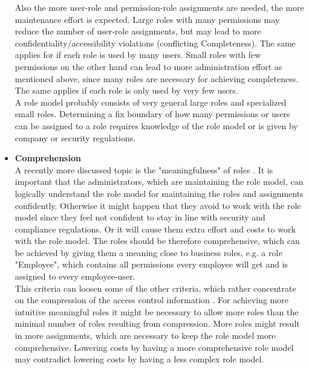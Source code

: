 \begin{itemize}
        Also the more user-role and permission-role assignments are needed, the more maintenance effort is expected. Large roles with many permissions may reduce the number of user-role assignments, but may lead to more confidentiality/accessibility violations (conflicting Completeness). The same applies for if each role is used by many users. Small roles with few permissions on the other hand can lead to more administration effort as mentioned above, since many roles are necessary for achieving completeness. The same applies if each role is only used by very few users.\\
        A role model probably consists of very general large roles and specialized small roles. Determining a fix boundary of how many permissions or users can be assigned to a role requires knowledge of the role model or is given by company or security regulations.
        \item \textbf{Comprehension}\\
        A recently more discussed topic is the "meaningfulness" of roles \cite{Xu}\cite{Frank}. It is important that the administrators, which are maintaining the role model, can logically understand the role model for maintaining the roles and assignments confidently. Otherwise it might happen that they avoid to work with the role model since they feel not confident to stay in line with security and compliance regulations. Or it will cause them extra effort and costs to work with the role model. The roles should be therefore comprehensive, which can be achieved by giving them a meaning close to business roles, e.g. a role "Employee", which contains all permissions every employee will get and is assigned to every employee-user.\\
        This criteria can loosen some of the other criteria, which rather concentrate on the compression of the access control information \cite{Frank2013}. For achieving more intuitive meaningful roles it might be necessary to allow more roles than the minimal number of roles resulting from compression. More roles might result in more assignments, which are necessary to keep the role model more comprehensive. Lowering costs by having a more comprehensive role model may contradict lowering costs by having a less complex role model.
    \end{itemize}
    
